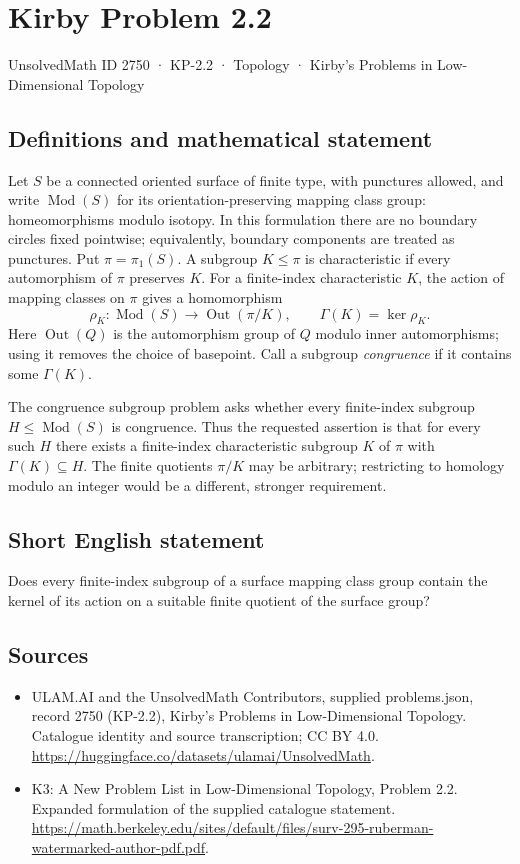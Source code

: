 \documentclass[11pt,a4paper]{article}
\begin{document}
\section*{Kirby Problem 2.2}\label{2750}
{\small UnsolvedMath ID 2750 · KP-2.2 · Topology · Kirby's Problems in Low-Dimensional Topology}
\subsection{Definitions and mathematical statement}
Let $S$ be a connected oriented surface of finite type, with punctures allowed,
and write $\operatorname{Mod}(S)$ for its orientation-preserving mapping class
group: homeomorphisms modulo isotopy. In this formulation there are no boundary
circles fixed pointwise; equivalently, boundary components are treated as punctures.
Put $\pi=\pi_1(S)$. A subgroup $K\leq\pi$ is characteristic if every automorphism
of $\pi$ preserves $K$. For a finite-index characteristic $K$, the action of mapping
classes on $\pi$ gives a homomorphism
\[
 \rho_K:\operatorname{Mod}(S)\longrightarrow\operatorname{Out}(\pi/K),
 \qquad \Gamma(K)=\ker\rho_K.
\]
Here $\operatorname{Out}(Q)$ is the automorphism group of $Q$ modulo inner
automorphisms; using it removes the choice of basepoint. Call a subgroup
\emph{congruence} if it contains some $\Gamma(K)$.

The congruence subgroup problem asks whether every finite-index subgroup
$H\leq\operatorname{Mod}(S)$ is congruence. Thus the requested assertion is that
for every such $H$ there exists a finite-index characteristic subgroup $K$ of
$\pi$ with $\Gamma(K)\subseteq H$. The finite quotients $\pi/K$ may be arbitrary;
restricting to homology modulo an integer would be a different, stronger requirement.
\subsection{Short English statement}
Does every finite-index subgroup of a surface mapping class group contain the kernel of its action on a suitable finite quotient of the surface group?
\subsection{Sources}
\begin{itemize}
\item[S1] ULAM.AI and the UnsolvedMath Contributors, supplied problems.json, record 2750 (KP-2.2), Kirby's Problems in Low-Dimensional Topology. Catalogue identity and source transcription; CC BY 4.0.
\url{https://huggingface.co/datasets/ulamai/UnsolvedMath}.
\item[S2] K3: A New Problem List in Low-Dimensional Topology, Problem 2.2. Expanded formulation of the supplied catalogue statement.
\url{https://math.berkeley.edu/sites/default/files/surv-295-ruberman-watermarked-author-pdf.pdf}.
\end{itemize}
\end{document}
